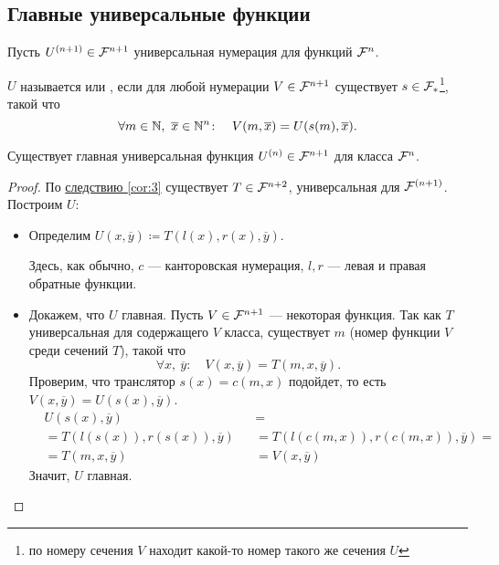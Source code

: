
\subsection{Главные универсальные функции}
\begin{defn}[]
	Пусть $ U^{(n+1)} \in \mathcal{F}^{n+1}$ универсальная нумерация для функций $ \mathcal{F}^{n}$. 

	\noindent
	$U$ называется  или , если для любой нумерации $V \in \mathcal{F}^{n+1}$  существует  $ s \in \mathcal{F}_{*}$\footnote{по номеру сечения $ V$ находит какой-то номер такого же сечения $ U$}, такой что 
	\[
		\forall m \in \mathbb{N},~ \overline{x} \in \mathbb{N}^{n} \colon \quad V(m, \overline{x}) = U(s(m), \overline{x}) 
	.\] 
\end{defn}


\begin{thm}
	Существует главная универсальная функция $ U^{(n)} \in \mathcal{F}^{n+1} $ для класса $ \mathcal{F}^{n}$.
\end{thm}
\begin{proof}
	По \hyperref[cor:3]{следствию \ref{cor:3}} существует $ T \in \mathcal{F}^{n+2}$, универсальная для $ \mathcal{F}^{(n+1)}$. Построим $ U$:
	\begin{itemize}
		\item Определим $ U(x, \overline{y}) \coloneqq T(l(x), r(x), \overline{y})$.

		Здесь, как обычно, $ c$ --- канторовская нумерация, $ l, r$ --- левая и правая обратные функции. 
	\item Докажем, что $ U$ главная. Пусть $ V \in \mathcal{F}^{n+1}$ --- некоторая функция.
		Так как $ T$ универсальная для содержащего $ V$ класса, существует $ m$ (номер функции $ V$ среди сечений $ T$), такой что
			\[
				\forall x,~ \overline{y}\colon \quad V(x, \overline{y}) = T(m, x, \overline{y})
			.\] 
			Проверим, что транслятор $ s(x) = c(m, x)$ подойдет, то есть $ V(x, \overline{y}) = U(s(x), \overline{y})$.
			\begin{align*}
				&U(s(x), \overline{y})  &&= \tag{По определению $ U$} \\
				&= T(l(s(x)), r(s(x)), \overline{y}) &&= T(l(c(m, x)), r(c(m, x)), \overline{y}) = \\
				&= T(m, x, \overline{y}) && = V(x, \overline{y})
			\end{align*}
			Значит, $ U$ главная.
	\end{itemize}
\end{proof}


